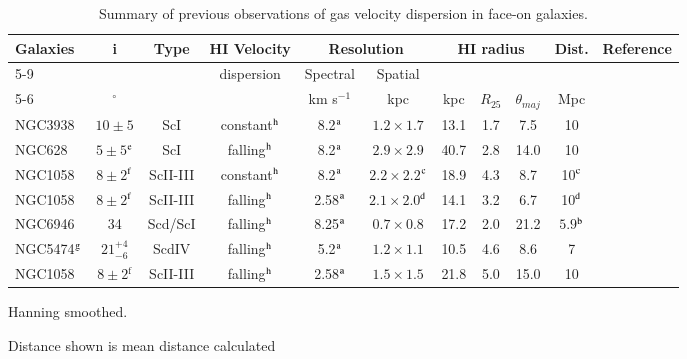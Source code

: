 \documentclass[traditabstract]{aa} %
\newcommand\kms{km s$^{-1}$}
\newcommand\dg{$^{\circ }$}
\begin{document}
\begin{table}[t] %
\caption[Summary of previous measurements of gas velocity dispersion 
in face-on galaxies]
{Summary of   previous observations of gas velocity dispersion in 
face-on galaxies.}
\label{tab:ch4-vel-disp-meas-lowi}
\begin{footnotesize}
\begin{tabular}{lcccccccccl}
\hline
Galaxies & i & Type & H{\scriptsize I} Velocity & 
\multicolumn{2}{c}{Resolution} &
\multicolumn{3}{c}{H{\scriptsize I} radius} & Dist. & Reference \\
\cline{5-9}
& & & dispersion & Spectral &
Spatial & & & & & \\
\cline{5-6}
& \dg & & & \kms & kpc & kpc & $R_{25}$ & $\theta_{maj}$ & Mpc & \\
\hline\hline
NGC3938 & $10\pm5$ & ScI & constant$^{\rm h}$ & 8.2$^{\rm a}$ &
$1.2 \times 1.7$ & 13.1 & 1.7
& 7.5 & 10 & \citet{vdks1982c} \\
NGC628 & $5\pm5$$^{\rm e}$ & ScI & falling$^{\rm h}$ & 8.2$^{\rm a}$ &
 $2.9 \times 2.9$ & 40.7 & 2.8 & 14.0 &
10 & \citet{svdk1984} \\
NGC1058 & $8\pm2$$^{\rm f}$ & Sc{\sc II-III} & constant$^{\rm h}$ &
8.2$^{\rm a}$ &
$2.2 \times 2.2$$^{\rm c}$ & 18.9 & 4.3 & 8.7 & 10$^{\rm c}$ &
\citet{vdks1984} \\
NGC1058 & $8\pm2$$^{\rm f}$ & Sc{\sc II-III} & falling$^{\rm h}$ &
2.58$^{\rm a}$ &
$2.1 \times 2.0$$^{\rm d}$ & 14.1 & 3.2 & 6.7 & 10$^{\rm d}$ &
\citet{dhh1990} \\
NGC6946 & 34 & Scd/Sc{\sc I} & falling$^{\rm h}$ & 8.25$^{\rm a}$ &
$0.7 \times 0.8$ & 17.2 & 2.0 & 21.2 & $5.9$$^{\rm b}$ &
\citet{bv1992} \\
NGC5474$^{\rm g}$ & $21^{+4}_{-6}$ & ScdIV & falling$^{\rm h}$ &
5.2$^{\rm a}$ & $1.2
\times 1.1$ & 10.5 & 4.6 & 8.6 & 7 &
\citet{rdh1994} \\
NGC1058 & $8\pm2$$^{\mathrm f}$ & Sc{\sc II-III} & falling$^{\rm h}$ &
2.58$^{\rm a}$ &
$1.5 \times 1.5$ & 21.8 & 5.0 & 15.0 & 10 &
\citet{pr2006} \\
\hline
\end{tabular}
\begin{list}{}{}
\item[$^{\mathrm{a}}$] Hanning smoothed.
\item[$^{\mathrm{b}}$] Distance shown is mean distance calculated 

\end{list}
\end{footnotesize}
\end{table}
\end{document}
